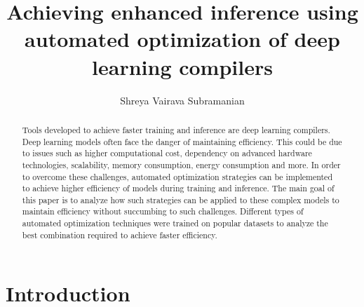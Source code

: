 \documentclass[sigconf]{acmart}
\begin{document}
\title{Achieving enhanced inference using automated optimization of deep learning compilers}

\author{Shreya Vairava Subramanian}

\begin{abstract}
Tools developed to achieve faster training and inference are deep learning compilers. Deep learning models often face the danger of maintaining efficiency. This could be due to issues such as higher computational cost, dependency on advanced hardware technologies, scalability, memory consumption, energy consumption and more. In order to overcome these challenges, automated optimization strategies can be implemented to achieve higher efficiency of models during training and inference. The main goal of this paper is to analyze how such strategies can be applied to these complex models to maintain efficiency without succumbing to such challenges. Different types of automated optimization techniques were trained on popular datasets to analyze the best combination required to achieve faster efficiency. 
\end{abstract}

\maketitle

\section{Introduction}
\end{document}
